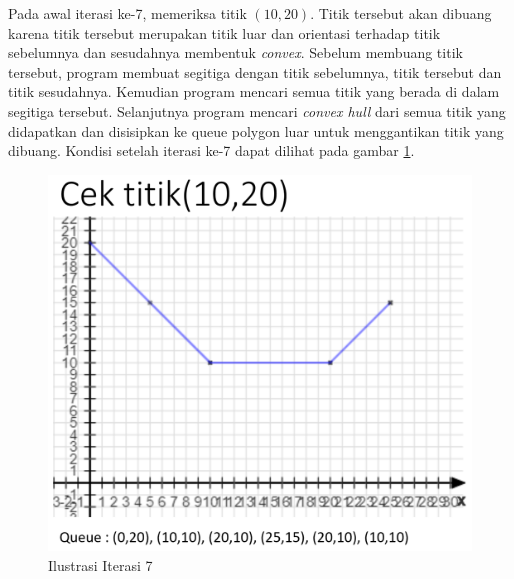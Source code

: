 \par Pada awal iterasi ke-7, memeriksa titik $(10,20)$. Titik tersebut akan dibuang karena titik tersebut merupakan titik luar dan orientasi terhadap titik sebelumnya dan sesudahnya membentuk \textit{convex}. Sebelum membuang titik tersebut, program membuat segitiga dengan titik sebelumnya, titik tersebut dan titik sesudahnya. Kemudian program mencari semua titik yang berada di dalam segitiga tersebut. Selanjutnya program mencari \textit{convex hull} dari semua titik yang didapatkan dan disisipkan ke queue polygon luar untuk menggantikan titik yang dibuang. Kondisi setelah iterasi ke-7 dapat dilihat pada gambar \ref{fig:iterasi-7}.
\begin{figure}[!h]
	\Centering
	\includegraphics [width=\columnwidth]{bab5/img/iterasi-7}
	\caption {Ilustrasi Iterasi 7}
	\label {fig:iterasi-7}
\end{figure}

